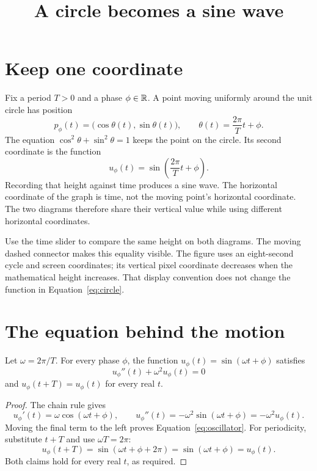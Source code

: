 \documentclass[11pt]{article}
\title{A circle becomes a sine wave}
\begin{document}
\maketitle

\section{Keep one coordinate}
Fix a period $T>0$ and a phase $\phi\in\mathbb{R}$. A point moving uniformly
around the unit circle has position
\begin{equation}\label{eq:circle}
  p_\phi(t)=\bigl(\cos\theta(t),\sin\theta(t)\bigr),
  \qquad \theta(t)=\frac{2\pi}{T}t+\phi.
\end{equation}
The equation $\cos^2\theta+\sin^2\theta=1$ keeps the point on the circle.
Its second coordinate is the function
\[
  u_\phi(t)=\sin\!\left(\frac{2\pi}{T}t+\phi\right).
\]
Recording that height against time produces a sine wave. The horizontal
coordinate of the graph is time, not the moving point's horizontal coordinate.
The two diagrams therefore share their vertical value while using different
horizontal coordinates.


Use the time slider to compare the same height on both diagrams. The moving
dashed connector makes this equality visible. The figure uses an eight-second
cycle and screen coordinates; its vertical pixel coordinate decreases when
the mathematical height increases. That display convention does not change
the function in Equation~\ref{eq:circle}.

\section{The equation behind the motion}
\begin{theorem}\label{thm:harmonic}
Let $\omega=2\pi/T$. For every phase $\phi$, the function
$u_\phi(t)=\sin(\omega t+\phi)$ satisfies
\begin{equation}\label{eq:oscillator}
  u_\phi''(t)+\omega^2u_\phi(t)=0
\end{equation}
and $u_\phi(t+T)=u_\phi(t)$ for every real $t$.
\end{theorem}
\begin{proof}
The chain rule gives
\[
  u_\phi'(t)=\omega\cos(\omega t+\phi),
  \qquad
  u_\phi''(t)=-\omega^2\sin(\omega t+\phi)=-\omega^2u_\phi(t).
\]
Moving the final term to the left proves Equation~\ref{eq:oscillator}.
For periodicity, substitute $t+T$ and use $\omega T=2\pi$:
\[
  u_\phi(t+T)=\sin(\omega t+\phi+2\pi)
             =\sin(\omega t+\phi)=u_\phi(t).
\]
Both claims hold for every real $t$, as required.
\end{proof}
\end{document}
